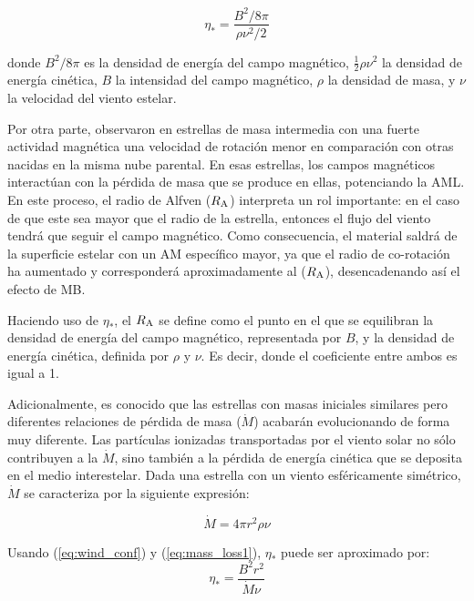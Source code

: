 \begin{ceqn}
\begin{equation}
    \eta_* = \frac{B^{2}/8\pi}{\rho\nu^2/2} \label{eq:wind_conf}
\end{equation}
\end{ceqn}

donde $B^{2}/8\pi$ es la densidad de energía del campo magnético, $\frac{1}{2}\rho\nu^{2}$ la densidad de energía cinética, $B$ la intensidad del campo magnético, $\rho$ la densidad de masa, y $\nu$ la velocidad del viento estelar.\par

Por otra parte, \cite{Mathys2006} observaron en estrellas de masa intermedia con una fuerte actividad magnética una velocidad de rotación menor en comparación con otras nacidas en la misma nube parental. En esas estrellas, los campos magnéticos interactúan con la pérdida de masa que se produce en ellas, potenciando la AML. En este proceso, el radio de Alfven ($R_{\mathrm{A}}$) interpreta un rol importante: en el caso de que este sea mayor que el radio de la estrella, entonces el flujo del viento tendrá que seguir el campo magnético. Como consecuencia, el material saldrá de la superficie estelar con un AM específico mayor, ya que el radio de co-rotación ha aumentado y corresponderá aproximadamente al ($R_{\mathrm{A}}$), desencadenando así el efecto de MB.\par 

Haciendo uso de $\eta_*$, el $R_{\mathrm{A}}$ se define como el punto en el que se equilibran la densidad de energía del campo magnético, representada por $B$, y la densidad de energía cinética, definida por $\rho$ y $\nu$. Es decir, donde el coeficiente entre ambos es igual a 1.\par

Adicionalmente, es conocido que las estrellas con masas iniciales similares pero diferentes relaciones de pérdida de masa ($\Dot{M}$) acabarán evolucionando de forma muy diferente. Las partículas ionizadas transportadas por el viento solar no sólo contribuyen a la $\Dot{M}$, sino también a la pérdida de energía cinética que se deposita en el medio interestelar. Dada una estrella con un viento esféricamente simétrico, $\Dot{M}$ se caracteriza por la siguiente expresión:

\begin{equation}
    \Dot{M} = 4\pi r^2\rho\nu \label{eq:mass_loss1}
\end{equation}

Usando (\ref{eq:wind_conf}) y (\ref{eq:mass_loss1}), $\eta_*$ puede ser aproximado por: 
\begin{equation}
    \eta_* = \frac{B^{2}r^{2}}{\Dot{M}\nu} \label{eq:wind_conf2}
\end{equation}


